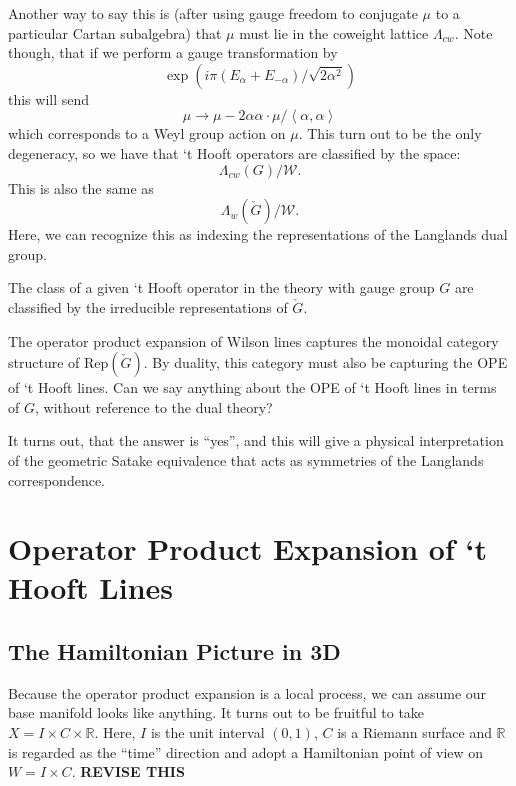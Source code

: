 		Another way to say this is (after using gauge freedom to conjugate $\mu$ to a particular Cartan subalgebra) that $\mu$ must lie in the coweight lattice $\Lambda_{cw}$. Note though, that if we perform a gauge transformation by
		\[
			\exp(i \pi (E_\alpha + E_{-\alpha})/\sqrt{2 \alpha^2})	
		\]
		this will send
		\[
			\mu \to \mu - 2 \alpha \alpha \cdot \mu/\left<\alpha, \alpha\right>
		\]
		which corresponds to a Weyl group action on $\mu$. This turn out to be the only degeneracy, so we have that `t Hooft operators are classified by the space:
		\[
			\Lambda_{cw}(G)/\mathcal W.
		\]
		This is also the same as 
		\[
			\Lambda_{w}(\check G)/\mathcal W.	
		\]
		Here, we can recognize this as indexing the representations of the Langlands dual group. 
		\begin{prop}
			The class of a given `t Hooft operator in the theory with gauge group $G$ are classified by the irreducible representations of $\check G$.
		\end{prop}
		
		The operator product expansion of Wilson lines captures the monoidal category structure of $\mathrm{Rep}(\check G)$. By duality, this category must also be capturing the OPE of `t Hooft lines. Can we say anything about the OPE of `t Hooft lines in terms of $G$, without reference to the dual theory?
		
		It turns out, that the answer is ``yes'', and this will give a physical interpretation of the geometric Satake equivalence that acts as symmetries of the Langlands correspondence.


	\section{Operator Product Expansion of `t Hooft Lines}
	
	\subsection{The Hamiltonian Picture in 3D} %
	\label{sub:the_hamiltonian_picture_in_3d}
	
	Because the operator product expansion is a local process, we can assume our base manifold looks like anything. It turns out to be fruitful to take $X = I \times C \times \mathbb R$. Here, $I$ is the unit interval $(0, 1)$, $C$ is a Riemann surface and $\mathbb R$ is regarded as the ``time'' direction and adopt a Hamiltonian point of view on $W = I \times C$. \textbf{REVISE THIS}
	

